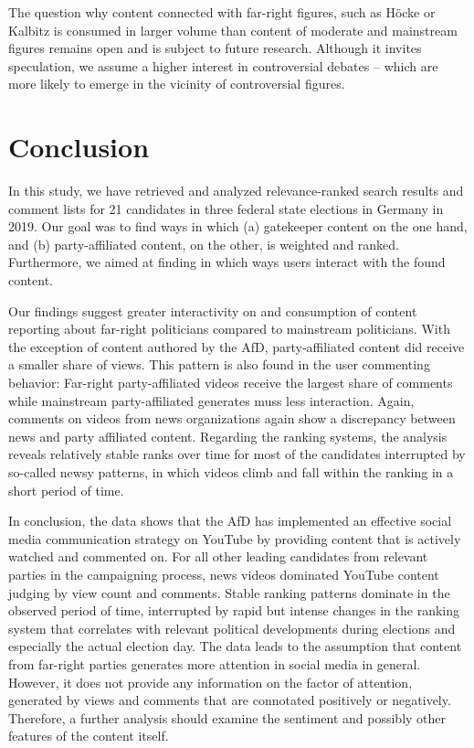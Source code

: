 \documentclass[sigchi, nonacm=true]{acmart}
\begin{document}
  The question why content connected with far-right figures, such as H\"ocke or Kalbitz is consumed in larger volume than content of moderate and mainstream figures remains open and is subject to future research. Although it invites speculation, we assume a higher interest in controversial debates -- which are more likely to emerge in the vicinity of controversial figures.

\section{Conclusion}

  In this study, we have retrieved and analyzed relevance-ranked search results and comment lists for 21 candidates in three federal state elections in Germany in 2019. Our goal was to find ways in which (a) gatekeeper content on the one hand, and (b) party-affiliated content, on the other, is weighted and ranked. Furthermore, we aimed at finding in which ways users interact with the found content.
  
  Our findings suggest greater interactivity on and consumption of content reporting about far-right politicians compared to mainstream politicians. With the exception of content authored by the AfD, party-affiliated content did receive a smaller share of views. This pattern is also found in the user commenting behavior: Far-right party-affiliated videos receive the largest share of comments while mainstream party-affiliated generates muss less interaction. Again, comments on videos from news organizations again show a discrepancy between news and party affiliated content. Regarding the ranking systems, the analysis reveals relatively stable ranks over time for most of the candidates interrupted by so-called newsy patterns, in which videos climb and fall within the ranking in a short period of time. 
  
  In conclusion, the data shows that the AfD has implemented an effective social media communication strategy on YouTube by providing content that is actively watched and commented on. For all other leading candidates from relevant parties in the campaigning process, news videos dominated YouTube content judging by view count and comments. Stable ranking patterns dominate in the observed period of time, interrupted by rapid but intense changes in the ranking system that correlates with relevant political developments during elections and especially the actual election day. The data leads to the assumption that content from far-right parties generates more attention in social media in general. However, it does not provide any information on the factor of attention, generated by views and comments that are connotated positively or negatively. Therefore, a further analysis should examine the sentiment and possibly other features of the content itself.
  
\end{document}
